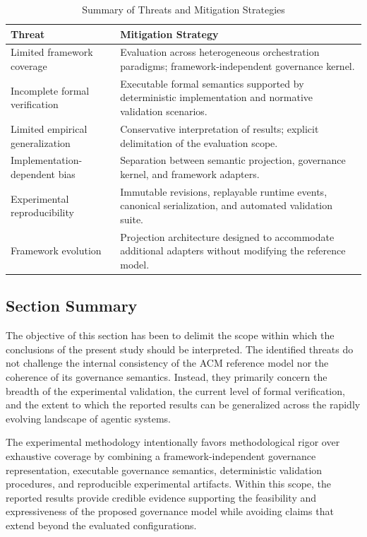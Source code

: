 \documentclass[10pt]{article}
\begin{document}
\begin{table}[t]
\caption{Summary of Threats and Mitigation Strategies}
\label{tab:mitigation_strategies}
\centering
\begin{tabular}{p{4.2cm}p{3.9cm}}
\toprule
\textbf{Threat} & \textbf{Mitigation Strategy} \\
\midrule
Limited framework coverage &
Evaluation across heterogeneous orchestration paradigms; framework-independent governance kernel. \\

Incomplete formal verification &
Executable formal semantics supported by deterministic implementation and normative validation scenarios. \\

Limited empirical generalization &
Conservative interpretation of results; explicit delimitation of the evaluation scope. \\

Implementation-dependent bias &
Separation between semantic projection, governance kernel, and framework adapters. \\

Experimental reproducibility &
Immutable revisions, replayable runtime events, canonical serialization, and automated validation suite. \\

Framework evolution &
Projection architecture designed to accommodate additional adapters without modifying the reference model. \\
\bottomrule
\end{tabular}
\end{table}

\subsection{Section Summary}
\label{sec:threats_summary}

The objective of this section has been to delimit the scope within which the conclusions of the present study should be interpreted. The identified threats do not challenge the internal consistency of the ACM reference model nor the coherence of its governance semantics. Instead, they primarily concern the breadth of the experimental validation, the current level of formal verification, and the extent to which the reported results can be generalized across the rapidly evolving landscape of agentic systems.

The experimental methodology intentionally favors methodological rigor over exhaustive coverage by combining a framework-independent governance representation, executable governance semantics, deterministic validation procedures, and reproducible experimental artifacts. Within this scope, the reported results provide credible evidence supporting the feasibility and expressiveness of the proposed governance model while avoiding claims that extend beyond the evaluated configurations.
\end{document}
